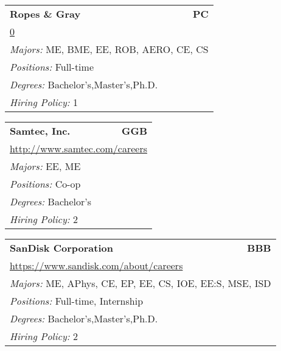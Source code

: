 \documentclass[twoside]{article}
\begin{document}
\begin{center}
\begin{multicols}{3}
\begin{FlushLeft}
\begin{minipage}{\columnwidth}\begin{tabularx}{.95\columnwidth}{Xr}
                 {\Large\bf Ropes \& Gray} & {\Large\bf PC}\\
    \multicolumn{2}{p{.95\columnwidth}}{\url{0}}\\
    \multicolumn{2}{p{.95\columnwidth}}{\emph{Majors:} ME, BME, EE, ROB, AERO, CE, CS}\\
    \multicolumn{2}{p{.95\columnwidth}}{\emph{Positions:} Full-time}\\
    \multicolumn{2}{p{.95\columnwidth}}{\emph{Degrees:} Bachelor's,Master's,Ph.D.}\\
    \multicolumn{2}{p{.95\columnwidth}}{\emph{Hiring Policy:} 1}\\
    \end{tabularx}
    
\end{minipage}
 
\begin{minipage}{\columnwidth}\begin{tabularx}{.95\columnwidth}{Xr}
                 {\Large\bf Samtec, Inc.} & {\Large\bf GGB}\\
    \multicolumn{2}{p{.95\columnwidth}}{\url{http://www.samtec.com/careers}}\\
    \multicolumn{2}{p{.95\columnwidth}}{\emph{Majors:} EE, ME}\\
    \multicolumn{2}{p{.95\columnwidth}}{\emph{Positions:} Co-op}\\
    \multicolumn{2}{p{.95\columnwidth}}{\emph{Degrees:} Bachelor's}\\
    \multicolumn{2}{p{.95\columnwidth}}{\emph{Hiring Policy:} 2}\\
    \end{tabularx}
    
\end{minipage}
 
\begin{minipage}{\columnwidth}\begin{tabularx}{.95\columnwidth}{Xr}
                 {\Large\bf SanDisk Corporation} & {\Large\bf BBB}\\
    \multicolumn{2}{p{.95\columnwidth}}{\url{https://www.sandisk.com/about/careers}}\\
    \multicolumn{2}{p{.95\columnwidth}}{\emph{Majors:} ME, APhys, CE, EP, EE, CS, IOE, EE:S, MSE, ISD}\\
    \multicolumn{2}{p{.95\columnwidth}}{\emph{Positions:} Full-time, Internship}\\
    \multicolumn{2}{p{.95\columnwidth}}{\emph{Degrees:} Bachelor's,Master's,Ph.D.}\\
    \multicolumn{2}{p{.95\columnwidth}}{\emph{Hiring Policy:} 2}\\
    \end{tabularx}
    

\end{minipage}
\end{FlushLeft}
\end{multicols}
\end{center}
\end{document}
